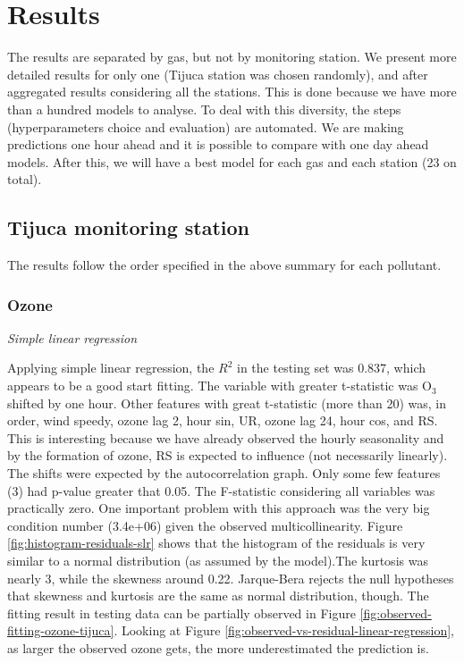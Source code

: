\section{Results}
\label{sec:results}

The results are separated by gas, but not by monitoring station. We present
more detailed results for only one (Tijuca station was chosen randomly), and after aggregated results
considering all the stations. This is done because we have more than
a hundred models to analyse. To deal with this diversity, the steps
(hyperparameters choice and evaluation) are automated. We are
making predictions one hour ahead and it is possible to compare with one day
ahead models. After this, we will have a best model for each gas and each
station (23 on total). 

\subsection{Tijuca monitoring station}

The results follow the order specified in the above summary for each pollutant. 

\subsubsection{Ozone}

{\em Simple linear regression}

\vspace{2mm}

Applying simple linear regression, the $R^2$ in the testing set was 0.837,
which appears to be a good start fitting. The variable with greater t-statistic
was O$_3$ shifted by one hour. Other features with great t-statistic (more than
20) was, in
order, wind speedy, ozone lag 2, hour sin, UR, ozone lag 24, hour cos, and RS.
This is interesting because we have already observed the hourly seasonality
and by the formation of ozone, RS is expected to influence (not necessarily
linearly). The shifts were expected by the autocorrelation graph. Only some few features (3) had p-value greater that 0.05. The
F-statistic considering all variables was practically zero. One important
problem with this approach was the very big condition number (3.4e+06) given
the observed multicollinearity. Figure \ref{fig:histogram-residuals-slr} shows
that the histogram of the residuals is very similar to a normal distribution (as
assumed by the model).The kurtosis was nearly 3, while the skewness around
0.22. Jarque-Bera rejects the null hypotheses that skewness and kurtosis are the same
as normal distribution, though. The fitting result in testing data can be
partially observed in Figure \ref{fig:observed-fitting-ozone-tijuca}. Looking
at Figure  \ref{fig:observed-vs-residual-linear-regression}, as larger the
observed ozone gets, the more underestimated the prediction is.

